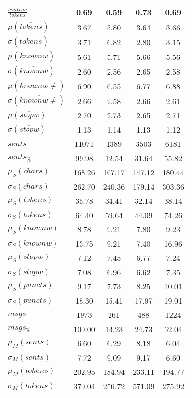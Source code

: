 \begin{table}[h!]
\begin{center}
\begin{tabular}{| l || c | c | c | c |}
$\frac{contrac}{tokens}$ & 0.69  & 0.59  & 0.73  & 0.69 \\\hline\hline
$\mu(\overline{tokens})$ & 3.67  & 3.80  & 3.64  & 3.66 \\
$\sigma(\overline{tokens})$ & 3.71  & 6.82  & 2.80  & 3.15 \\\hline
$\mu(\overline{knownw})$ & 5.61  & 5.71  & 5.66  & 5.56 \\
$\sigma(\overline{knownw})$ & 2.60  & 2.56  & 2.65  & 2.58 \\\hline
$\mu(\overline{knownw \neq})$ & 6.90  & 6.55  & 6.77  & 6.88 \\
$\sigma(\overline{knownw \neq})$ & 2.66  & 2.58  & 2.66  & 2.61 \\\hline
$\mu(\overline{stopw})$ & 2.70  & 2.73  & 2.65  & 2.71 \\
$\sigma(\overline{stopw})$ & 1.13  & 1.14  & 1.13  & 1.12 \\\hline\hline
$sents$ & 11071  & 1389  & 3503  & 6181 \\
$sents_{\%}$ & 99.98  & 12.54  & 31.64  & 55.82 \\\hline
$\mu_S(chars)$ & 168.26  & 167.17  & 147.12  & 180.44 \\
$\sigma_S(chars)$ & 262.70  & 240.36  & 179.14  & 303.36 \\\hline
$\mu_S(tokens)$ & 35.78  & 34.41  & 32.14  & 38.14 \\
$\sigma_S(tokens)$ & 64.40  & 59.64  & 44.09  & 74.26 \\\hline
$\mu_S(knownw)$ & 8.78  & 9.21  & 7.80  & 9.23 \\
$\sigma_S(knownw)$ & 13.75  & 9.21  & 7.40  & 16.96 \\\hline
$\mu_S(stopw)$ & 7.12  & 7.45  & 6.77  & 7.24 \\
$\sigma_S(stopw)$ & 7.08  & 6.96  & 6.62  & 7.35 \\\hline
$\mu_S(puncts)$ & 9.17  & 7.73  & 8.25  & 10.01 \\
$\sigma_S(puncts)$ & 18.30  & 15.41  & 17.97  & 19.01 \\\hline\hline
$msgs$ & 1973  & 261  & 488  & 1224 \\
$msgs_{\%}$ & 100.00  & 13.23  & 24.73  & 62.04 \\\hline
$\mu_M(sents)$ & 6.60  & 6.29  & 8.18  & 6.04 \\
$\sigma_M(sents)$ & 7.72  & 9.09  & 9.17  & 6.60 \\\hline
$\mu_M(tokens)$ & 202.95  & 184.94  & 233.11  & 194.77 \\
$\sigma_M(tokens)$ & 370.04  & 256.72  & 571.09  & 275.92 \\\hline

\end{tabular}
\end{center}
\end{table}

